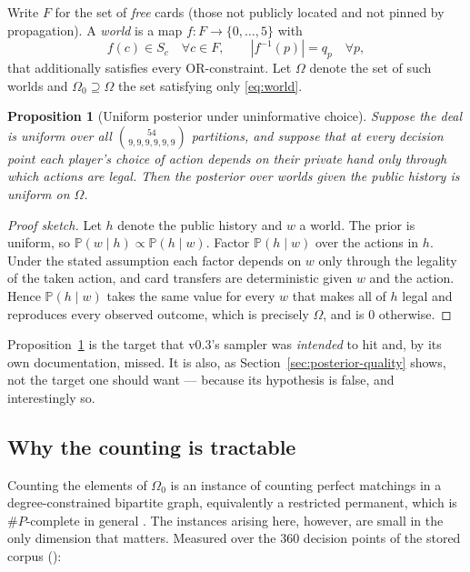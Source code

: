 \documentclass[11pt,a4paper]{article}
\newtheorem{proposition}{Proposition}
\newcommand{\Prob}{\ensuremath{\mathbb{P}}}
\begin{document}
Write $F$ for the set of \emph{free} cards (those not publicly located and not
pinned by propagation). A \emph{world} is a map $f : F \to \{0,\dots,5\}$ with
\begin{equation}
f(c) \in S_c \quad \forall c \in F,
\qquad
|f^{-1}(p)| = q_p \quad \forall p,
\label{eq:world}
\end{equation}
that additionally satisfies every OR-constraint. Let $\Omega$ denote the set of
such worlds and $\Omega_0 \supseteq \Omega$ the set satisfying only
\eqref{eq:world}.

\begin{proposition}[Uniform posterior under uninformative choice]
\label{prop:uniform}
Suppose the deal is uniform over all $\binom{54}{9,9,9,9,9,9}$ partitions, and
suppose that at every decision point each player's choice of action depends on
their private hand only through which actions are legal. Then the posterior
over worlds given the public history is uniform on $\Omega$.
\end{proposition}

\begin{proof}[Proof sketch]
Let $h$ denote the public history and $w$ a world. The prior is uniform, so
$\Prob(w \mid h) \propto \Prob(h \mid w)$. Factor $\Prob(h \mid w)$ over the
actions in $h$. Under the stated assumption each factor depends on $w$ only
through the legality of the taken action, and card transfers are deterministic
given $w$ and the action. Hence $\Prob(h \mid w)$ takes the same value for
every $w$ that makes all of $h$ legal and reproduces every observed outcome,
which is precisely $\Omega$, and is $0$ otherwise.
\end{proof}

Proposition~\ref{prop:uniform} is the target that v0.3's sampler was
\emph{intended} to hit and, by its own documentation, missed. It is also, as
Section~\ref{sec:posterior-quality} shows, not the target one should want ---
because its hypothesis is false, and interestingly so.

\subsection{Why the counting is tractable}

Counting the elements of $\Omega_0$ is an instance of counting perfect
matchings in a degree-constrained bipartite graph, equivalently a restricted
permanent, which is $\#P$-complete in general \citep{valiant1979complexity}.
The instances arising here, however, are small in the only dimension that
matters. Measured over the $360$ decision points of the stored corpus
():
\end{document}
